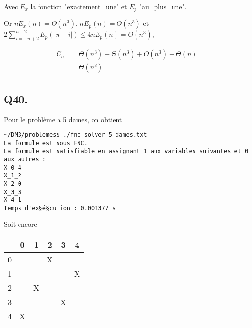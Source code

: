     Avec $E_x$ la fonction "exactement\_une" et $E_p$ "au\_plus\_une".
    
    Or $nE_x(n) = \Theta(n^3)$, $nE_p(n) = \Theta(n^3)$ et
    $2\sum_{i=-n+2}^{n-2}E_p(|n-i|) \leq 4nE_p(n) = O(n^3)$,
    
    \begin{align*}
        C_n &= \Theta(n^3) + \Theta(n^3) + O(n^3) +\Theta(n)\\
        &= \Theta(n^3)\\
    \end{align*}
    
    \subsection*{Q40.}
    Pour le problème a 5 dames, on obtient
    \begin{lstlisting}
~/DM3/problemes$ ./fnc_solver 5_dames.txt 
La formule est sous FNC.
La formule est satisfiable en assignant 1 aux variables suivantes et 0 aux autres :
X_0_4
X_1_2
X_2_0
X_3_3
X_4_1
Temps d'ex§é§cution : 0.001377 s
    \end{lstlisting}
    Soit encore
    \begin{center}
        \begin{tabular}{| c || *{5}{c |}}
        \hline
          & 0 & 1 & 2 & 3 & 4 \\
        \hline
        \hline
        0 &   &   & X &   &   \\
        \hline
        1 &   &   &   &   & X \\
        \hline
        2 &   & X &   &   &   \\
        \hline
        3 &   &   &   & X &   \\
        \hline
        4 & X &   &   &   &   \\
        \hline
        \end{tabular}
    \end{center}
    
